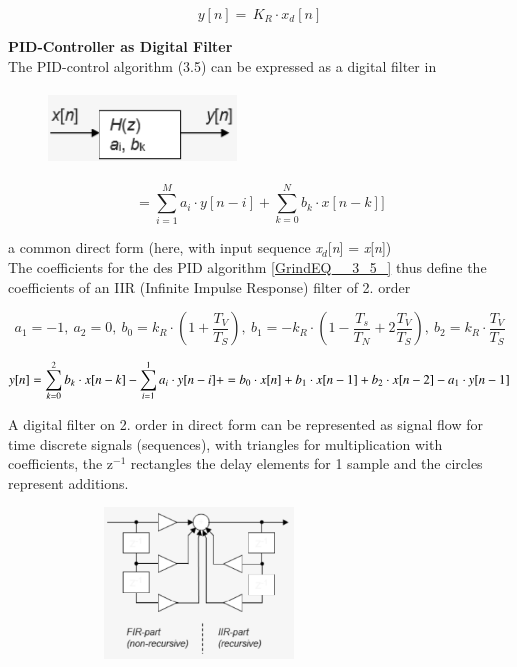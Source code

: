 \begin{equation}
	y[n]=\, K_{R} \cdot x_{d} [n]
\label{EQ }
\end{equation}

{\rot\bf PID-Controller as Digital Filter }\\

The PID-control algorithm (3.5) can be expressed as a digital filter in  

	\begin{figure}[h]
    \centering
    \includegraphics[width=5cm, height=2cm]{Images/image151.png}
    \label{fig:Fig }
    \end{figure}
    
\begin{equation}
	[y[n]=\sum _{i=1}^{M}a_{i} \cdot y[n-i] +\sum _{k=0}^{N}b_{k} \cdot x[n-k]]
\label{EQ }
\end{equation}

a common direct form (here, with input sequence \textit{x${}_{d}$}[\textit{n}] = \textit{x}[\textit{n}]) \\

The coefficients for the des PID algorithm \eqref{GrindEQ__3_5_} thus define the coefficients of an  IIR (Infinite Impulse Response) filter of 2. order

\begin{equation*}
	a_1=-1,\ a_2=0,\ b_0=k_R \cdot \left(1+\frac{T_V}{T_S}\right),\ b_1=-k_R \cdot \left(1-\frac{T_s}{T_N}+2 \frac{T_V}{T_S}\right),\ b_2=k_R \cdot \frac{T_V}{T_S}
\label{EQ }
\end{equation*}

\begin{equation*}
	y[n] = {\sum_{k=0}^{2}b_{k} \cdot x[n-k] - \sum_{i=1}^{1}a_{i} \cdot y[n-i] +} \\ = b_{0} \cdot x[n]+b_{1} \cdot x[n-1]+b_{2} \cdot x[n-2] - a_{1} \cdot y[n-1]
\label{EQ }
\end{equation*}

A digital filter on 2. order in direct form can be represented as signal flow for time discrete signals (sequences), with triangles for multiplication with coefficients, the z${}^{-1\ \ }$rectangles the delay elements for 1 sample and the circles represent additions.

	\begin{figure}[h]
    \centering
    \includegraphics[width=8cm, height=4cm]{Images/image152.png}
    \label{fig:Fig }
    \end{figure}

